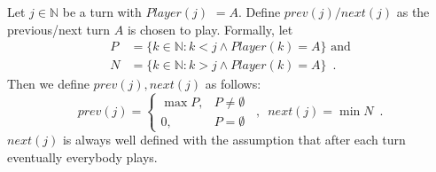 \begin{definition}
  Let $j \in \mathbb{N}$ be a turn with $Player\left(j\right)$ $= A$. Define $prev\left(j\right)/next\left(j\right)$
  as the previous/next turn $A$ is chosen to play. Formally, let
  \begin{align*}
    P &= \{k \in \mathbb{N} : k < j \wedge Player\left(k\right) = A\} \mbox{ and} \\
    N &= \{k \in \mathbb{N} : k > j \wedge Player\left(k\right) = A\} \enspace.
  \end{align*}
  Then we define $prev\left(j\right), next\left(j\right)$ as follows:
  \begin{equation*}
    prev\left(j\right) = \begin{cases}
      \max{P}, & P \neq \emptyset \\
      0, & P = \emptyset
    \end{cases} \enspace, \enspace
    next\left(j\right) = \min{N} \enspace.
  \end{equation*}
  \ifdefined\proceedings
  \else
    $next\left(j\right)$ is always well defined with the assumption that after each turn eventually everybody plays.
  \fi
\end{definition}
